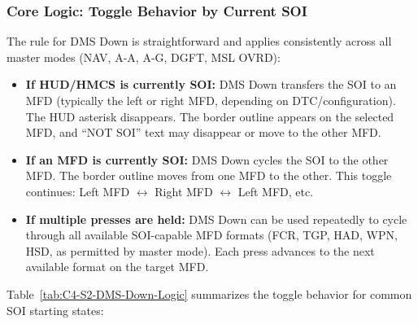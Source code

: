 \documentclass[11pt,a4paper]{article}
\begin{document}
\subsubsection{Core Logic: Toggle Behavior by Current SOI}

The rule for DMS Down is straightforward and applies consistently across all master modes (NAV, A-A, A-G, DGFT, MSL OVRD):

\begin{itemize}

\item \textbf{If HUD/HMCS is currently SOI:} DMS Down transfers the SOI to an MFD (typically the left or right MFD, depending on DTC/configuration). The HUD asterisk disappears. The border outline appears on the selected MFD, and ``NOT SOI'' text may disappear or move to the other MFD.

\item \textbf{If an MFD is currently SOI:} DMS Down cycles the SOI to the other MFD. The border outline moves from one MFD to the other. This toggle continues: Left MFD $\leftrightarrow$ Right MFD $\leftrightarrow$ Left MFD, etc.

\item \textbf{If multiple presses are held:} DMS Down can be used repeatedly to cycle through all available SOI-capable MFD formats (FCR, TGP, HAD, WPN, HSD, as permitted by master mode). Each press advances to the next available format on the target MFD.

\end{itemize}

Table~\ref{tab:C4-S2-DMS-Down-Logic} summarizes the toggle behavior for common SOI starting states:
\end{document}
